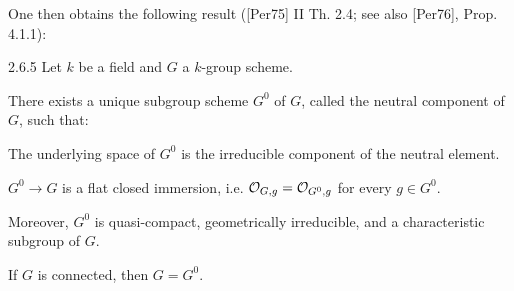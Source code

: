 One then obtains the following result ([Per75] II Th. 2.4; see also [Per76], Prop. 4.1.1):
\begin{theorem}{2.6.5}\label{VIA.2.6.5}
Let $k$ be a field and $G$ a $k$-group scheme.
\begin{enumeratei}
\item There exists a unique subgroup scheme $G^0$ of $G$, called the neutral component of $G$, such that:
\begin{enumeratea}
\item The underlying space of $G^0$ is the irreducible component of the neutral element.
\item $G^0\to G$ is a flat closed immersion, i.e. $\mathcal{O}_{G,g}=\mathcal{O}_{G^0,g}$ for every $g\in G^0$.
\end{enumeratea}
\item Moreover, $G^0$ is quasi-compact, geometrically irreducible, and a characteristic subgroup of $G$.
\item If $G$ is connected, then $G=G^0$.
\end{enumeratei}
\end{theorem}
